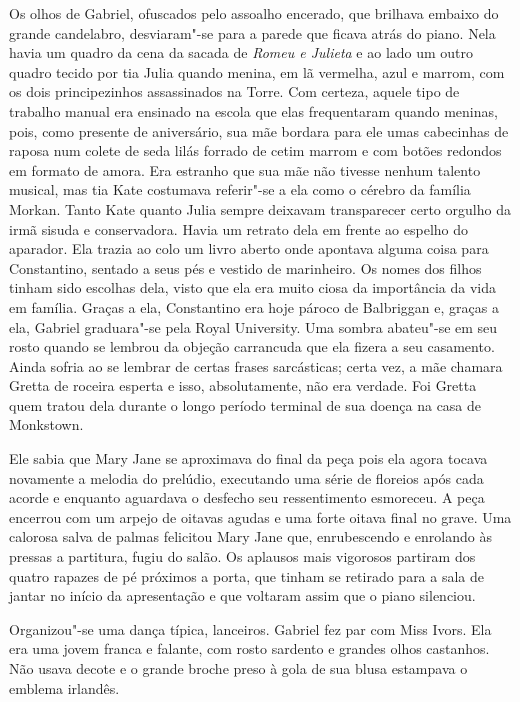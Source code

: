 Os olhos de Gabriel, ofuscados pelo assoalho encerado, que brilhava embaixo do
grande candelabro, desviaram"-se para a parede que ficava atrás do piano.  Nela
havia um quadro da cena da sacada de \textit{Romeu e Julieta} e ao lado um
outro quadro tecido por tia Julia quando menina, em lã vermelha, azul e marrom,
com os dois principezinhos assassinados na Torre.  Com certeza, aquele tipo de
trabalho manual era ensinado na escola que elas frequentaram quando meninas,
pois, como presente de aniversário, sua mãe bordara para ele umas cabecinhas de
raposa num colete de seda lilás forrado de cetim marrom e com botões redondos
em formato de amora.  Era estranho que sua mãe não tivesse nenhum talento
musical, mas tia Kate costumava referir"-se a ela como o cérebro da família
Morkan.  Tanto Kate quanto Julia sempre deixavam transparecer certo orgulho da
irmã sisuda e conservadora.  Havia um retrato dela em frente ao espelho do
aparador.  Ela trazia ao colo um livro aberto onde apontava alguma coisa para
Constantino, sentado a seus pés e vestido de marinheiro.  Os nomes dos filhos
tinham sido escolhas dela, visto que ela era muito ciosa da importância da vida
em família.  Graças a ela, Constantino era hoje pároco de Balbriggan e, graças
a ela, Gabriel graduara"-se pela Royal University.  Uma sombra abateu"-se em seu
rosto quando se lembrou da objeção carrancuda que ela fizera a seu casamento.
Ainda sofria ao se lembrar de certas frases sarcásticas; certa vez, a mãe
chamara Gretta de roceira esperta e isso, absolutamente, não era verdade.  Foi
Gretta quem tratou dela durante o longo período terminal de sua doença na casa
de Monkstown.

Ele sabia que Mary Jane se aproximava do final da peça pois ela agora tocava
novamente a melodia do prelúdio, executando uma série de floreios após cada
acorde e enquanto aguardava o desfecho seu ressentimento esmoreceu.  A peça
encerrou com um arpejo de oitavas agudas e uma forte oitava final no grave.
Uma calorosa salva de palmas felicitou Mary Jane que, enrubescendo e enrolando
às pressas a partitura, fugiu do salão.  Os aplausos mais vigorosos partiram
dos quatro rapazes de pé próximos a porta, que tinham se retirado para a sala
de jantar no início da apresentação e que voltaram assim que o piano silenciou.

Organizou"-se uma dança típica, lanceiros.  Gabriel fez par com Miss Ivors.  Ela
era uma jovem franca e falante, com rosto sardento e grandes olhos castanhos.
Não usava decote e o grande broche preso à gola de sua blusa estampava o
emblema irlandês.

